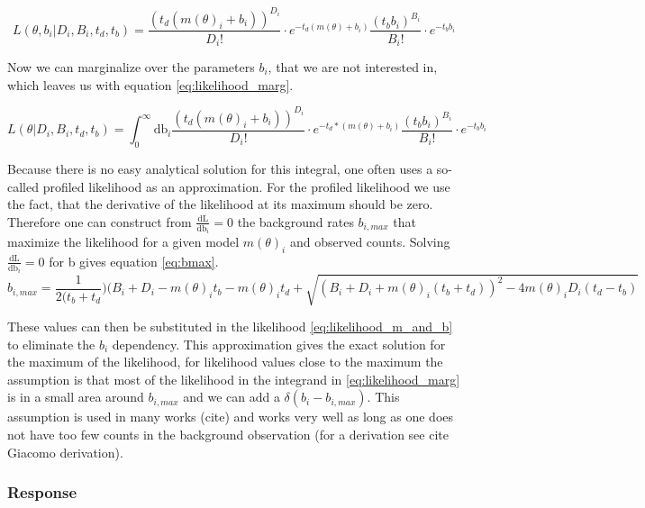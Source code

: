 \documentclass[modern]{aastex631}
\begin{document}
\begin{equation}
	L(\theta, b_{i}|D_{i}, B_{i},t_{d},t_{b}) = \frac{(t_{d}(m(\theta)_{i}+ b_{i}))^{D_{i}}}{D_{i}!}\cdot e^{-t_{d}(m(\theta)+b_{i})} \frac{(t_{b} b_{i})^{B_{i}}}{B_{i}!}\cdot e^{-t_{b} b_{i}}
  \label{eq:likelihood_m_and_b}
\end{equation}

Now we can marginalize over the parameters $b_{i}$, that we are not interested in, which leaves us with equation \ref{eq:likelihood_marg}.

\begin{equation}
	L(\theta|D_{i}, B_{i},t_{d},t_{b}) = \int_{0}^{\infty}\textrm{db}_{i}\frac{(t_{d}(m(\theta)_{i}+ b_{i}))^{D_{i}}}{D_{i}!}\cdot e^{-t_{d}*(m(\theta)+b_{i})} \frac{(t_{b} b_{i})^{B_{i}}}{B_{i}!}\cdot e^{-t_{b}b_{i}}
  \label{eq:likelihood_marg}
\end{equation}

Because there is no easy analytical solution for this integral, one often uses a so-called profiled likelihood as an approximation. For the profiled likelihood we use the fact, that the derivative of the likelihood at its maximum should be zero. Therefore one can construct from $\frac{\textrm{dL}}{\textrm{db}_i}=0$ the background rates $b_{i, max}$ that maximize the likelihood for a given model $m(\theta)_{i}$ and observed counts. Solving $\frac{\textrm{dL}}{\textrm{db}_i}=0$ for b gives equation \ref{eq:bmax}.
\begin{equation}
	b_{i,max}=\frac{1}{2(t_{b}+t_{d}})(B_{i}+D_{i}-m(\theta)_{i}t_{b}-m(\theta)_{i}t_{d}+\sqrt{(B_{i}+D_{i}+m(\theta)_{i}(t_{b}+t_{d}))^{2}-4m(\theta)_{i}D_{i}(t_{d}-t_{b})}
  \label{eq:bmax}
\end{equation}

These values can then be substituted in the likelihood \ref{eq:likelihood_m_and_b} to eliminate the $b_{i}$ dependency. This approximation gives the exact solution for the maximum of the likelihood, for likelihood values close to the maximum the assumption is that most of the likelihood in the integrand in \ref{eq:likelihood_marg} is in a small area around $b_{i,max}$ and we can add a $\delta(b_{i}-b_{{i,max}})$. This assumption is used in many works (cite) and works very well as long as one does not have too few counts in the background observation (for a derivation see cite Giacomo derivation).

\subsubsection*{Response}
\end{document}
